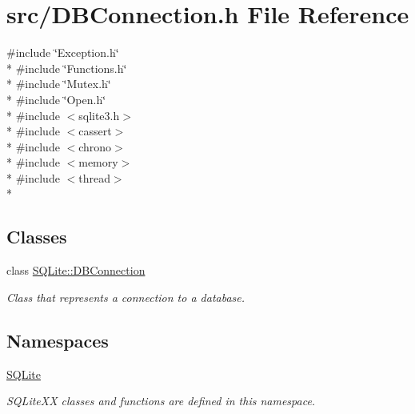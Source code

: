 \hypertarget{a00022}{\section{src/\-D\-B\-Connection.h File Reference}
\label{a00022}
}
{\ttfamily \#include \char`\"{}Exception.\-h\char`\"{}}\\*
{\ttfamily \#include \char`\"{}Functions.\-h\char`\"{}}\\*
{\ttfamily \#include \char`\"{}Mutex.\-h\char`\"{}}\\*
{\ttfamily \#include \char`\"{}Open.\-h\char`\"{}}\\*
{\ttfamily \#include $<$sqlite3.\-h$>$}\\*
{\ttfamily \#include $<$cassert$>$}\\*
{\ttfamily \#include $<$chrono$>$}\\*
{\ttfamily \#include $<$memory$>$}\\*
{\ttfamily \#include $<$thread$>$}\\*
\subsection*{Classes}
\begin{DoxyCompactItemize}
\item 
class \hyperlink{a00004}{S\-Q\-Lite\-::\-D\-B\-Connection}
\begin{DoxyCompactList}\small\item\em Class that represents a connection to a database. \end{DoxyCompactList}\end{DoxyCompactItemize}
\subsection*{Namespaces}
\begin{DoxyCompactItemize}
\item 
\hyperlink{a00038}{S\-Q\-Lite}
\begin{DoxyCompactList}\small\item\em S\-Q\-Lite\-X\-X classes and functions are defined in this namespace. \end{DoxyCompactList}\end{DoxyCompactItemize}

